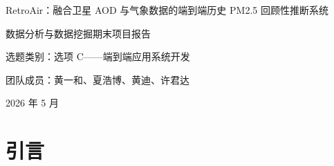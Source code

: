\documentclass[UTF8,zihao=-4,a4paper]{ctexart}
\newcommand{\pmfine}{PM$_{2.5}$}
\newcommand{\aod}{AOD}
\begin{document}
\begin{titlepage}
  \centering
  \vspace*{2.6cm}
  {\heiti RetroAir：融合卫星 AOD 与气象数据的端到端历史 PM2.5 回顾性推断系统\par}
  \vspace{1.2cm}
  {\heiti 数据分析与数据挖掘期末项目报告\par}
  \vspace{2.2cm}
  {选题类别：选项 C——端到端应用系统开发\par}
  \vspace{0.8cm}
  {团队成员：黄一和、夏浩博、黄迪、许君达\par}
  \vfill
  {2026 年 5 月\par}
\end{titlepage}

\begin{abstract}
地面空气质量监测站能够提供可靠的 \pmfine{} 浓度观测，但其空间覆盖受建设成本和维护条件限制，难以满足无站点地区历史暴露评估、环境健康研究和城市空气质量回顾分析的需求。针对这一问题，本文设计并实现了 RetroAir，一个融合卫星气溶胶光学厚度（Aerosol Optical Depth, \aod{}）与气象数据的端到端历史 \pmfine{} 回顾性推断系统。系统以 AKShare 真气网监测站数据作为监督标签，结合 CAMS EAC4 气溶胶再分析数据和 NASA POWER 日尺度气象数据，构建覆盖 2018--2025 年、中国 8 个城市、126 个监测站的多源融合数据集。方法上，系统形成了从数据获取、站点对齐、NetCDF 气溶胶特征提取、三源数据合并、特征标准化、模型训练、统一评估到 Web 推理应用的完整流水线。最终特征体系包含 9 个 \aod{} 特征、7 个气象特征和 1 个时间特征。

在模型层面，本文系统比较了 ResMLP、DCN-V2、CatBoost、LightGBM 和 XGBoost 等 5 类回归模型。实验结果表明，带 warmup 训练策略的残差多层感知机 ResMLP 在 8 城市 310,756 个样本上取得最优表现，测试集 $R^2$ 达 0.889，RMSE 为 9.76 $\mu g/m^3$，MAE 为 6.22 $\mu g/m^3$，Pearson 相关系数约为 0.94。消融实验显示，气象+\aod{} 特征组合优于引入 OSM 空间特征或 MODIS RGB 反射率的扩展组合，说明本任务中动态气溶胶与气象变量已经提供了主要预测信息。系统最终通过 Streamlit 构建轻量级交互界面，支持地图选点、城市快捷选择、日期选择和一键 \pmfine{} 推理，完成了数据挖掘应用从数据到决策展示的闭环。

\noindent\textbf{关键词：} \pmfine{}；气溶胶光学厚度；多源数据融合；ResMLP；数据挖掘；端到端应用系统
\end{abstract}

\newpage
\tableofcontents
\newpage

\section{引言}
\end{document}
